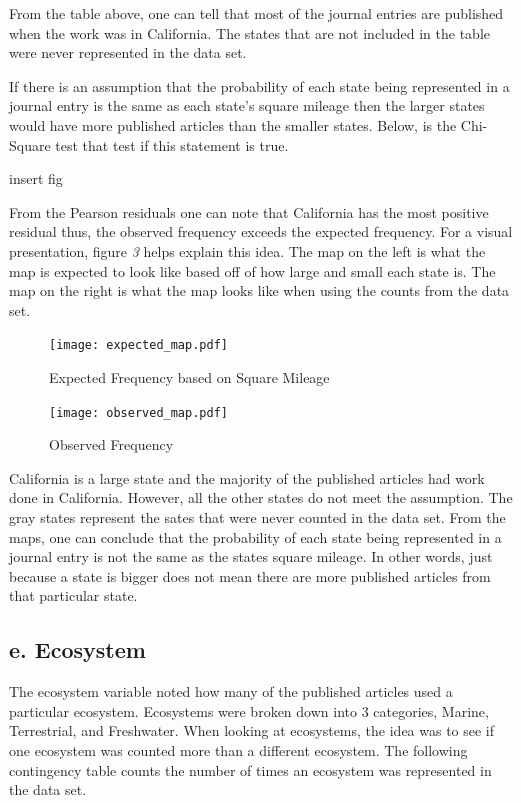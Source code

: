 \documentclass[
]{article}
\begin{document}
From the table above, one can tell that most of the journal entries are
published when the work was in California. The states that are not
included in the table were never represented in the data set.

If there is an assumption that the probability of each state being
represented in a journal entry is the same as each state's square
mileage then the larger states would have more published articles than
the smaller states. Below, is the Chi-Square test that test if this
statement is true.

insert fig

From the Pearson residuals one can note that California has the most
positive residual thus, the observed frequency exceeds the expected
frequency. For a visual presentation, figure \emph{3} helps explain this
idea. The map on the left is what the map is expected to look like based
off of how large and small each state is. The map on the right is what
the map looks like when using the counts from the data set.

\begin{figure}
  \caption{Expected Frequency based on Square Mileage}
    \texttt{[image: expected\_map.pdf]}
\end{figure}
\begin{figure}
  \caption{Observed Frequency}
    \texttt{[image: observed\_map.pdf]}
\end{figure}

California is a large state and the majority of the published articles
had work done in California. However, all the other states do not meet
the assumption. The gray states represent the sates that were never
counted in the data set. From the maps, one can conclude that the
probability of each state being represented in a journal entry is not
the same as the states square mileage. In other words, just because a
state is bigger does not mean there are more published articles from
that particular state.

\hypertarget{e.-ecosystem}{%
\subsection{e. Ecosystem}\label{e.-ecosystem}}

The ecosystem variable noted how many of the published articles used a
particular ecosystem. Ecosystems were broken down into 3 categories,
Marine, Terrestrial, and Freshwater. When looking at ecosystems, the
idea was to see if one ecosystem was counted more than a different
ecosystem. The following contingency table counts the number of times an
ecosystem was represented in the data set.
\end{document}
